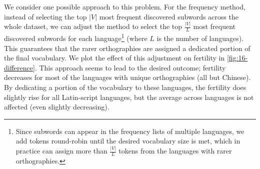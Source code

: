 We consider one possible approach to this problem. For the frequency method, instead of selecting the top $|V|$ most frequent discovered subwords across the whole dataset, we can adjust the method to select the top $\frac{|V|}{L}$ most frequent discovered subwords for each language\footnote{Since subwords can appear in the frequency lists of multiple languages, we add tokens round-robin until the desired vocabulary size is met, which in practice can assign more than $\frac{|V|}{L}$ tokens from the languages with rarer orthographies.} (where $L$ is the number of languages). This guarantees that the rarer orthographies are assigned a dedicated portion of the final vocabulary. We plot the effect of this adjustment on fertility in \cref{fig:16-difference}. This approach seems to lead to the desired outcome; fertility decreases for most of the languages with unique orthographies (all but Chinese). By dedicating a portion of the vocabulary to these languages, the fertility does slightly rise for all Latin-script languages, but the average across languages is not affected (even slightly decreasing). 






